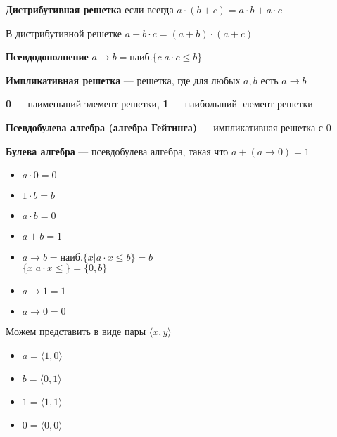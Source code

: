 \documentclass[english]{article}
\begin{document}
\begin{definition}
	\textbf{Дистрибутивная решетка} если всегда  \(a \cdot (b + c) = a \cdot b + a \cdot c\)
	\label{org4c1b85d}
\end{definition}
\begin{lemma}
	В дистрибутивной решетке \(a + b\cdot c = (a + b) \cdot(a + c)\)
	\label{org78b6809}
\end{lemma}
\begin{definition}
	\textbf{Псевдодополнение} \(a \to b = \text{наиб.}\{c \big| a \cdot c \le b\}\)
	\label{orgc09946b}
\end{definition}
\begin{definition}
	\textbf{Импликативная решетка} --- решетка, где для любых \(a, b\) есть \(a \to b\)
	\label{org922d0d4}
\end{definition}
\begin{definition}
	\textbf{0} --- наименьший элемент решетки, \textbf{1} --- наибольший элемент решетки
	\label{orge2e1c3d}
\end{definition}
\begin{definition}
	\textbf{Псевдобулева алгебра (алгебра Гейтинга)} --- импликативная решетка с \(0\)
	\label{orgb60cc47}
\end{definition}
\begin{definition}
	\textbf{Булева алгебра} --- псевдобулева алгебра, такая что \(a + (a \to 0) = 1\)
	\label{org8b1fe92}
\end{definition}
\begin{examp}
	\-
	\begin{center}
	\end{center}
	\begin{itemize}
		\item \(a \cdot 0 = 0\)
		\item \(1\cdot b = b\)
		\item \(a \cdot b = 0\)
		\item \(a + b = 1\)
		\item \(a \to b = \text{наиб.}\{x \big| a\cdot x \le b\} = b\) \\
		      \(\{x \big| a \cdot x \le \} = \{0, b\}\)
		\item \(a \to 1 = 1\)
		\item \(a \to 0 = 0\)
	\end{itemize}
	Можем представить в виде пары \(\langle x, y \rangle\)
	\begin{itemize}
		\item \(a = \langle 1, 0 \rangle\)
		\item \(b = \langle 0 , 1\rangle\)
		\item \(1 = \langle 1, 1 \rangle\)
		\item \(0 = \langle 0, 0 \rangle\)
	\end{itemize}
	\label{org9d15960}
\end{examp}
\end{document}
